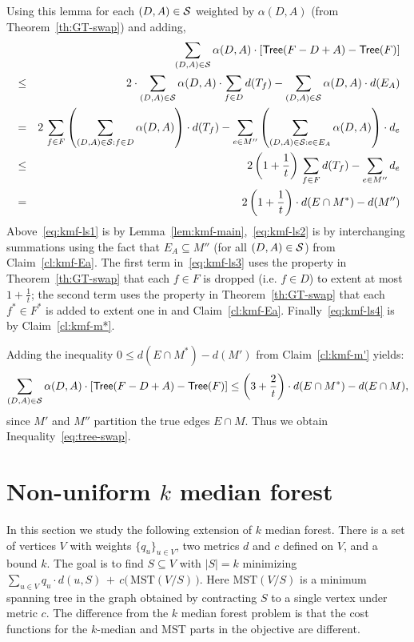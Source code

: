 \documentclass[11pt,twoside,a4paper]{article}
\newcommand{\sse}{\subseteq}
\def\kmf{$k$ median forest\xspace}
\begin{document}
Using this lemma for each $(D,A)\in\mathcal{S}$ weighted by $\alpha(D,A)$ (from Theorem~\ref{th:GT-swap}) and adding,
\begin{eqnarray}
&& \sum_{(D,A)\in \mathcal{S}} \alpha(D,A)\cdot \left[ {\sf Tree}(F-D+A)-{\sf Tree}(F) \right] \notag \\
&\le &2\cdot \sum_{(D,A)\in \mathcal{S}} \alpha(D,A)\cdot \sum_{f\in D} d(T_f) - \sum_{(D,A)\in \mathcal{S}} \alpha(D,A)\cdot d(E_A) \label{eq:kmf-ls1}\\
& = & 2\, \sum_{f\in F} \left( \sum_{(D,A)\in\mathcal{S} : f\in D} \alpha(D,A) \right) \cdot d(T_f) - \sum_{e\in M''} \left(
\sum_{(D,A)\in\mathcal{S} : e\in E_A} \alpha(D,A) \right)\cdot d_e \label{eq:kmf-ls2}\\
& \le & 2\left(1+\frac1t\right) \, \sum_{f\in F} d(T_f) - \sum_{e\in M''} d_e \label{eq:kmf-ls3}\\
&=& 2\left(1+\frac1t\right)\cdot d(E\cap M^*) - d(M'') \label{eq:kmf-ls4}
\end{eqnarray}
Above~\eqref{eq:kmf-ls1} is by Lemma~\ref{lem:kmf-main},~\eqref{eq:kmf-ls2} is by interchanging summations using the
fact that $E_A\sse M''$ (for all $(D,A)\in\mathcal{S}$) from Claim~\ref{cl:kmf-Ea}. The first term in~\eqref{eq:kmf-ls3} uses
the property in Theorem~\ref{th:GT-swap} that each $f\in F$ is dropped (i.e. $f\in D$) to extent at most $1+\frac1t$;
the second term uses the property in Theorem~\ref{th:GT-swap} that each $f^*\in F^*$ is added to extent one in \swap
and Claim~\ref{cl:kmf-Ea}. Finally~\eqref{eq:kmf-ls4} is by Claim~\ref{cl:kmf-m*}.


Adding the inequality $0\le d(E\cap M^*) - d(M')$ from Claim~\ref{cl:kmf-m'} yields:
\begin{equation*}\sum_{(D,A)\in \mathcal{S}}
\alpha(D,A)\cdot \left[ {\sf Tree}(F-D+A)-{\sf Tree}(F) \right] \le \left(3+\frac2t\right)\cdot d(E\cap M^*) - d(E\cap
M),\end{equation*} since $M'$ and $M''$ partition the true edges $E\cap M$. Thus we obtain
Inequality~\eqref{eq:tree-swap}.















\section{Non-uniform $k$ median forest}\label{sec:non-unif-kmf}
In this section we study the following extension of $k$ median forest. There is a set of vertices $V$ with weights
$\{q_u\}_{u\in V}$, two metrics $d$ and $c$ defined on $V$, and a bound $k$. The goal is to find $S\sse V$ with $|S|=k$
minimizing $\sum_{u\in V} q_u\cdot d(u,S) \, + \, c\big(\,\mbox{MST}(V/S)\,\big)$. Here $\mbox{MST}(V/S)$ is a minimum
spanning tree in the graph obtained by contracting $S$ to a single vertex under metric $c$. The difference from the
\kmf problem is that the cost functions for the $k$-median and MST parts in the objective are different.
\end{document}
